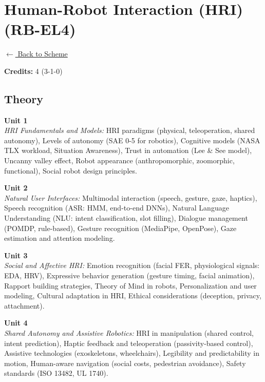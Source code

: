\section*{Human-Robot Interaction (HRI) (RB-EL4)}
\label{elec:RB_4}

\noindent \small{\hyperref[main:scheme]{$\leftarrow$ Back to Scheme}} \vspace{0.5cm}

\noindent \textbf{Credits:} 4 (3-1-0)

\subsection*{Theory}
\noindent\textbf{Unit 1} \\
\textit{HRI Fundamentals and Models:} HRI paradigms (physical, teleoperation, shared autonomy), Levels of autonomy (SAE 0-5 for robotics), Cognitive models (NASA TLX workload, Situation Awareness), Trust in automation (Lee \& See model), Uncanny valley effect, Robot appearance (anthropomorphic, zoomorphic, functional), Social robot design principles.

\vspace{0.3cm}

\noindent\textbf{Unit 2} \\
\textit{Natural User Interfaces:} Multimodal interaction (speech, gesture, gaze, haptics), Speech recognition (ASR: HMM, end-to-end DNNs), Natural Language Understanding (NLU: intent classification, slot filling), Dialogue management (POMDP, rule-based), Gesture recognition (MediaPipe, OpenPose), Gaze estimation and attention modeling.

\vspace{0.3cm}

\noindent\textbf{Unit 3} \\
\textit{Social and Affective HRI:} Emotion recognition (facial FER, physiological signals: EDA, HRV), Expressive behavior generation (gesture timing, facial animation), Rapport building strategies, Theory of Mind in robots, Personalization and user modeling, Cultural adaptation in HRI, Ethical considerations (deception, privacy, attachment).

\vspace{0.3cm}

\noindent\textbf{Unit 4} \\
\textit{Shared Autonomy and Assistive Robotics:} HRI in manipulation (shared control, intent prediction), Haptic feedback and teleoperation (passivity-based control), Assistive technologies (exoskeletons, wheelchairs), Legibility and predictability in motion, Human-aware navigation (social costs, pedestrian avoidance), Safety standards (ISO 13482, UL 1740).

